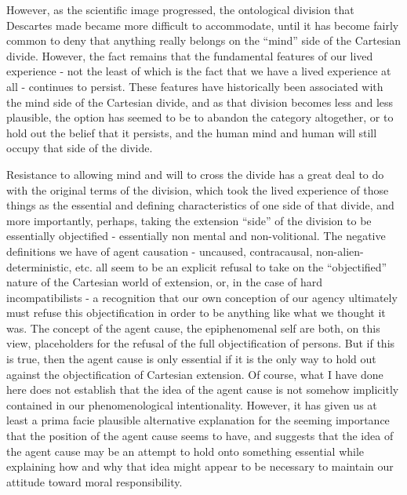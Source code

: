 \documentclass[phd,12pt,oneside,paper=letterpaper]{ubcthesis}
\begin{document}
However, as the scientific image progressed, the ontological division that Descartes made became more difficult to accommodate, until it has become fairly common to deny that anything really belongs on the ``mind'' side of the Cartesian divide. However, the fact remains that the fundamental features of our lived experience - not the least of which is the fact that we have a lived experience at all - continues to persist. These features have historically been associated with the mind side of the Cartesian divide, and as that division becomes less and less plausible, the option has seemed to be to abandon the category altogether, or to hold out the belief that it persists, and the human mind and human will still occupy that side of the divide. 

Resistance to allowing mind and will to cross the divide has a great deal to do with the original terms of the division, which took the lived experience of those things as the essential and defining characteristics of one side of that divide, and more importantly, perhaps, taking the extension ``side'' of the division to be essentially objectified - essentially non mental and non-volitional.  The negative definitions we have of agent causation - uncaused, contracausal, non-alien-deterministic, etc. all seem to be an explicit refusal to take on the ``objectified'' nature of the Cartesian world of extension, or, in the case of hard incompatibilists - a recognition that our own conception of our agency ultimately must refuse this objectification in order to be anything like what we thought it was. The concept of the agent cause, the epiphenomenal self are both, on this view, placeholders for the refusal of the full objectification of persons. But if this is true, then the agent cause is only essential if it is the only way to hold out against the objectification of Cartesian extension. 
Of course, what I have done here does not establish that the idea of the agent cause is not somehow implicitly contained in our phenomenological intentionality. However, it has given us at least a prima facie plausible alternative explanation  for the seeming importance that the position of the agent cause seems to have, and suggests that the idea of the agent cause may be an attempt to hold onto something essential while explaining how and why that idea might appear to be necessary to maintain our attitude toward moral responsibility. 
\end{document}
